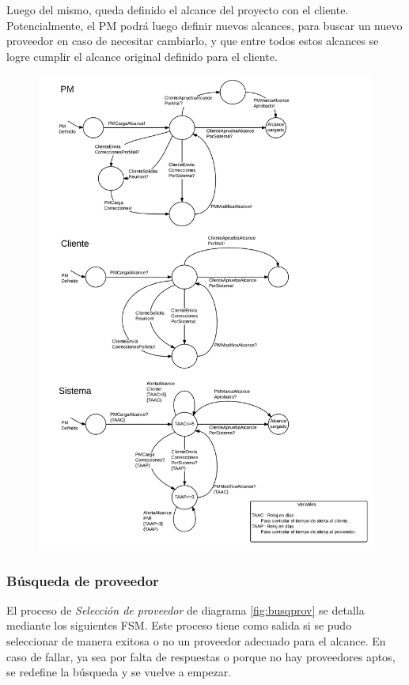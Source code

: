 Luego del mismo, queda definido el alcance del proyecto con el cliente. 
Potencialmente, el PM podrá luego definir nuevos alcances, para buscar un nuevo 
proveedor en caso de necesitar cambiarlo, y que entre todos estos alcances 
se logre cumplir el alcance original definido para el cliente. 

\begin{figure}[H]
\centering
\includegraphics[width=0.8\linewidth]{diag/nuevos/fsm-alcance.png}
\label{fsm-alcance}
\end{figure}


		\subsubsection{Búsqueda de proveedor}
El proceso de \textit{Selección de proveedor} de diagrama \ref{fig:busqprov} se detalla mediante 
los siguientes FSM. Este proceso tiene como salida si se pudo seleccionar de 
manera exitosa o no un proveedor adecuado para el alcance. En caso de fallar, ya sea 
por falta de respuestas o porque no hay proveedores aptos, se redefine la búsqueda y 
se vuelve a empezar. 

